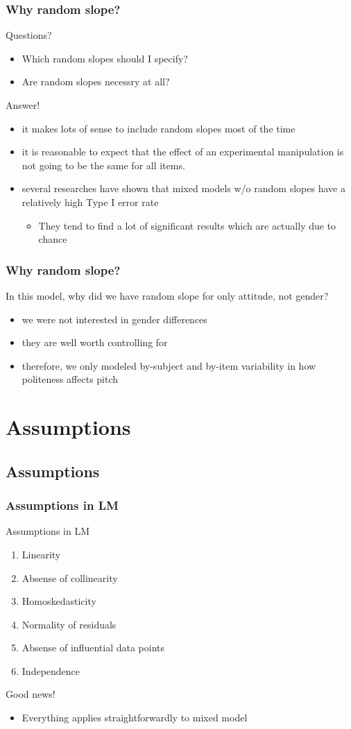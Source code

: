 \documentclass[10p]{beamer}\usepackage[]{graphicx}\usepackage[]{color}
\begin{document}
\begin{frame}
\frametitle{Why random slope?}
Questions?
\begin{itemize}
\item Which random slopes should I specify?
\item Are random slopes necessry at all?
\end{itemize}

Answer!
\begin{itemize}
\item it makes lots of sense to include random slopes most of the time
\item it is reasonable to expect that the effect of an experimental manipulation is not going to be the same for all items.
\item several researches  have shown that mixed models w/o random slopes have a relatively high Type I error rate
  \begin{itemize}
  \item They tend to find a lot of significant results which are actually due to chance
  \end{itemize}
\end{itemize}
\end{frame}

\begin{frame}
\frametitle{Why random slope?}
In this model, why did we have random slope for only attitude, not gender? 
\begin{itemize}
\item we were not interested in gender differences
\item they are well worth controlling for
\item therefore, we only modeled by-subject and by-item variability in how politeness affects pitch
\end{itemize}
\end{frame}

\section[Assume]{Assumptions}
\subsection{Assumptions}
\begin{frame}
\frametitle{Assumptions in LM}
Assumptions in LM
\begin{enumerate}
\item Linearity
\item Absense of collinearity
\item Homoskedasticity
\item Normality of residuals
\item Absense of influential data points
\item Independence
\end{enumerate}

Good news!
\begin{itemize}
\item Everything applies straightforwardly to mixed model
\end{itemize}

\end{frame}
\end{document}
